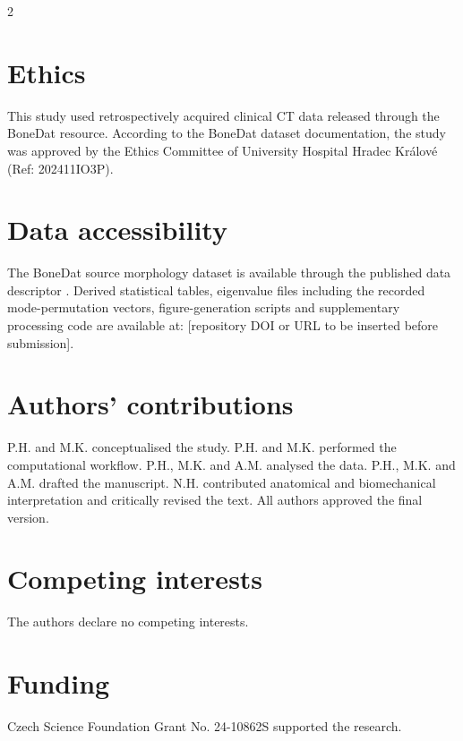 \documentclass[openacc]{rsproca_new}
\begin{document}
\begin{multicols}{2}
\section*{Ethics}

This study used retrospectively acquired clinical CT data released through the BoneDat resource. According to the BoneDat dataset documentation, the study was approved by the Ethics Committee of University Hospital Hradec Kr\'{a}lov\'{e} (Ref: 202411IO3P).

\section*{Data accessibility}

The BoneDat source morphology dataset is available through the published data descriptor \cite{HenysKuchar2025}. Derived statistical tables, eigenvalue files including the recorded mode-permutation vectors, figure-generation scripts and supplementary processing code are available at: [repository DOI or URL to be inserted before submission].

\section*{Authors' contributions}

P.H. and M.K. conceptualised the study. P.H. and M.K. performed the computational workflow. P.H., M.K. and A.M. analysed the data. P.H., M.K. and A.M. drafted the manuscript. N.H. contributed anatomical and biomechanical interpretation and critically revised the text. All authors approved the final version.

\section*{Competing interests}

The authors declare no competing interests.

\section*{Funding}
Czech Science Foundation Grant No. 24-10862S supported the research.
\end{multicols}
\end{document}

